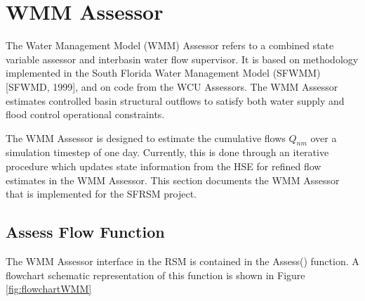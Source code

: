 \chapter{WMM Assessor}

The Water Management Model (WMM) Assessor refers to a combined state
variable assessor and interbasin water flow supervisor. It is based on
methodology implemented in the South Florida Water Management Model
(SFWMM)[SFWMD, 1999]\nocite{sfwmm:99}, and on code from the WCU
Assessors. The WMM Assessor estimates controlled basin structural
outflows to satisfy both water supply and flood control operational
constraints.

The WMM Assessor is designed to estimate the cumulative flows $Q_{nm}$
over a simulation timestep of one day. Currently, this is done through
an iterative procedure which updates state information from the HSE
for refined flow estimates in the WMM Assessor. This section documents
the WMM Assessor that is implemented for the SFRSM project.

\section{Assess Flow Function}\label{assessFunction}

The WMM Assessor interface in the RSM is contained in the Assess()
function. A flowchart schematic representation of this function is
shown in Figure \ref{fig:flowchartWMM}

